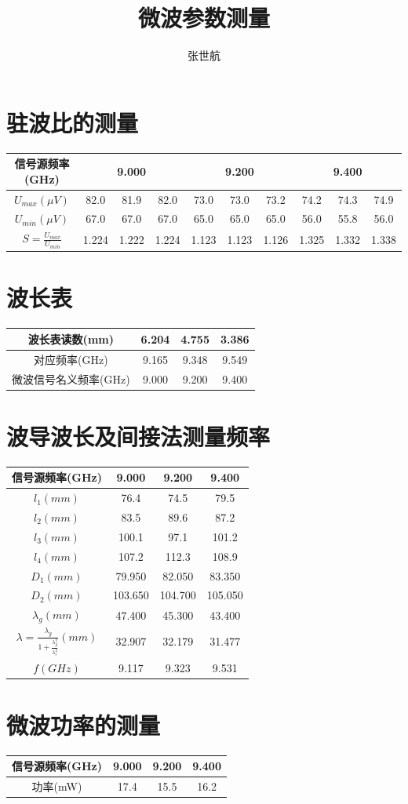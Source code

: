 \documentclass[10pt, a4paper]{article}
\title{微波参数测量}
\author{张世航}
\begin{document}
	\maketitle
	\section{驻波比的测量}
	\begin{tabular}{|c|c|c|c|c|c|c|c|c|c|}
		\hline
		信号源频率(GHz)& \multicolumn{3}{|c|}{9.000}&\multicolumn{3}{|c|}{9.200} &\multicolumn{3}{|c|}{9.400}\\
		\hline
		 $U_{max}(\mu V)$& 82.0 & 81.9 & 82.0 & 73.0 & 73.0 & 73.2 & 74.2 & 74.3 & 74.9   \\
		\hline
		$U_{min}(\mu V)$& 67.0 & 67.0 & 67.0 & 65.0 & 65.0 & 65.0 & 56.0 & 55.8 & 56.0   \\
		\hline
		$S=\frac{U_{max}}{U_{min}}$&1.224 & 1.222 & 1.224 & 1.123 & 1.123 & 1.126 & 1.325 & 1.332 & 1.338  \\
		\hline
	\end{tabular}
	
	\section{波长表}
	\begin{tabular}{|c|c|c|c|}
		\hline
		波长表读数(mm)& 6.204 & 4.755 & 3.386 \\
		\hline
		对应频率(GHz)& 9.165 & 9.348 & 9.549 \\
		\hline
		微波信号名义频率(GHz)& 9.000 & 9.200 & 9.400 \\
		\hline
	\end{tabular}
	
	\section{波导波长及间接法测量频率}
	\begin{tabular}{|c|c|c|c|}
		\hline
		信号源频率(GHz)& 9.000 & 9.200 & 9.400 \\
		\hline
		$l_1(mm)$ & 76.4 & 74.5 & 79.5 \\
		\hline
		$l_2(mm)$ & 83.5 & 89.6 & 87.2 \\
		\hline
		$l_3(mm)$ & 100.1 & 97.1 & 101.2 \\
		\hline
		$l_4(mm)$ & 107.2 & 112.3 & 108.9 \\
		\hline
		$D_1(mm)$ &79.950 & 82.050 & 83.350 \\
		\hline
		$D_2(mm)$ &103.650 & 104.700 & 105.050
		 \\
		\hline
		$\lambda_g(mm)$ &47.400 & 45.300 & 43.400 \\
		\hline
		$\lambda = \frac{\lambda_g}{1+\frac{\lambda_g^2}{\lambda_c^2}}(mm)$ &32.907 & 32.179 & 31.477\\
		\hline
		$f(GHz)$ & 9.117&9.323 &9.531\\
		\hline
	\end{tabular}
	
	\section{微波功率的测量}
	\begin{tabular}{|c|c|c|c|}
		\hline
		信号源频率(GHz)& 9.000 & 9.200 &  9.400  \\
		\hline
		功率(mW)& 17.4 & 15.5 & 16.2   \\
		\hline
	\end{tabular}
	
\end{document}
